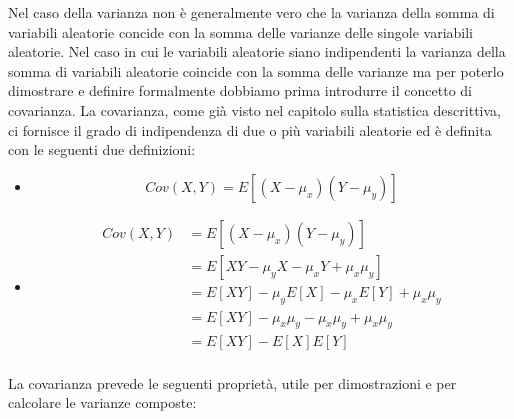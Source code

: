 \documentclass[a4paper,12pt, oneside]{book}
\begin{document}
Nel caso della varianza non è generalmente vero che la varianza della somma di variabili aleatorie concide con la 
somma delle varianze delle singole variabili aleatorie.\newline
Nel caso in cui le variabili aleatorie siano indipendenti la varianza della somma di variabili aleatorie coincide con la somma delle varianze
ma per poterlo dimostrare e definire formalmente dobbiamo prima introdurre il concetto di covarianza.\newline
La covarianza, come già visto nel capitolo sulla statistica descrittiva, ci fornisce il grado di indipendenza di
due o più variabili aleatorie ed è definita con le seguenti due definizioni:
\begin{itemize}
    \item \[ Cov(X, Y) = E[(X - \mu_x) (Y - \mu_y)] \]
    \item \[ \begin{split}
             Cov(X, Y) & = E[(X - \mu_x)(Y - \mu_y)] \\
                       & = E[XY - \mu_yX - \mu_xY + \mu_x\mu_y] \\
                       & = E[XY] -\mu_yE[X] - \mu_xE[Y] + \mu_x\mu_y\\
                       & = E[XY] -\mu_x\mu_y - \mu_x\mu_y + \mu_x\mu_y \\
                       & = E[XY] - E[X]E[Y]\\
            \end{split} \]
\end{itemize}
La covarianza prevede le seguenti proprietà, utile per dimostrazioni e per calcolare le varianze composte:
\end{document}
